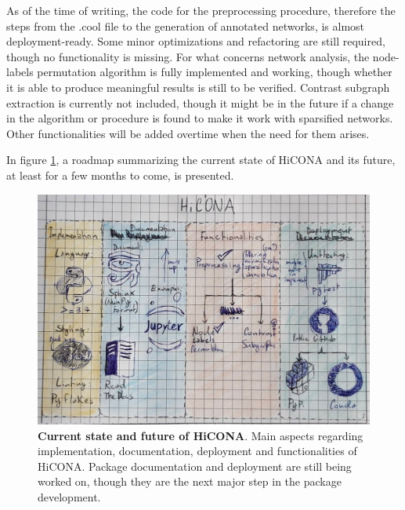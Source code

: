 As of the time of writing, the code for the preprocessing procedure, therefore the steps from the .cool file to the generation of annotated networks, is almost deployment-ready. Some minor optimizations and refactoring are still required, though no functionality is missing. For what concerns network analysis, the node-labels permutation algorithm is fully implemented and working, though whether it is able to produce meaningful results is still to be verified. Contrast subgraph extraction is currently not included, though it might be in the future if a change in the algorithm or procedure is found to make it work with sparsified networks. Other functionalities will be added overtime when the need for them arises.

In figure \ref{fig:roadmap}, a roadmap summarizing the current state of HiCONA and its future, at least for a few months to come, is presented.

\begin{figure}[ht]
  \centering
  \includegraphics[width=1\textwidth]{roadmap.jpeg}
  \caption{\textbf{Current state and future of HiCONA}. Main aspects regarding implementation, documentation, deployment and functionalities of HiCONA. Package documentation and deployment are still being worked on, though they are the next major step in the package development.}
  \label{fig:roadmap}
\end{figure}
